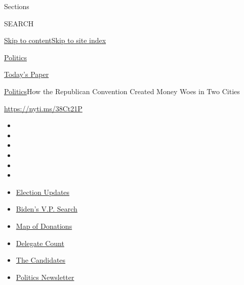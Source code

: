 Sections

SEARCH

\protect\hyperlink{site-content}{Skip to
content}\protect\hyperlink{site-index}{Skip to site index}

\href{https://www.nytimes.com/section/politics}{Politics}

\href{https://myaccount.nytimes.com/auth/login?response_type=cookie\&client_id=vi}{}

\href{https://www.nytimes.com/section/todayspaper}{Today's Paper}

\href{/section/politics}{Politics}\textbar{}How the Republican
Convention Created Money Woes in Two Cities

\url{https://nyti.ms/38Ct21P}

\begin{itemize}
\item
\item
\item
\item
\item
\item
\end{itemize}

\begin{itemize}
\item
  \href{https://www.nytimes.com/2020/07/31/us/elections/biden-vs-trump.html?action=click\&pgtype=Article\&state=default\&region=TOP_BANNER\&context=storylines_menu}{Election
  Updates}
\item
  \href{https://www.nytimes.com/article/biden-vice-president-2020.html?action=click\&pgtype=Article\&state=default\&region=TOP_BANNER\&context=storylines_menu}{Biden's
  V.P. Search}
\item
  \href{https://www.nytimes.com/interactive/2020/07/24/us/politics/trump-biden-campaign-donors.html?action=click\&pgtype=Article\&state=default\&region=TOP_BANNER\&context=storylines_menu}{Map
  of Donations}
\item
  \href{https://www.nytimes.com/interactive/2020/us/elections/delegate-count-primary-results.html?action=click\&pgtype=Article\&state=default\&region=TOP_BANNER\&context=storylines_menu}{Delegate
  Count}
\item
  \href{https://www.nytimes.com/interactive/2019/us/politics/2020-presidential-candidates.html?action=click\&pgtype=Article\&state=default\&region=TOP_BANNER\&context=storylines_menu}{The
  Candidates}
\item
  \href{https://www.nytimes.com/newsletters/politics?action=click\&pgtype=Article\&state=default\&region=TOP_BANNER\&context=storylines_menu}{Politics
  Newsletter}
\end{itemize}

